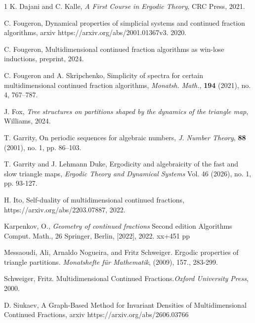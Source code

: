 \documentclass[12pt,oneside,openany]{article}
\begin{document}
\begin{thebibliography}{1}
 K. Dajani and C. Kalle, \textit{A First Course in Ergodic Theory}, CRC Press, 2021.


 C. Fougeron, Dynamical properties of simplicial systems and continued fraction algorithms,
arxiv  https://arxiv.org/abs/2001.01367v3. 2020.


 C. Fougeron,  Multidimensional continued fraction algorithms as win-lose inductions, preprint,
  2024.



 C. Fougeron and A. Skripchenko, Simplicity of spectra for certain multidimensional continued fraction algorithms, {\it Monatsh. Math.}, \textbf{194} (2021), no. 4, 767--787.

 J. Fox, {\it Tree structures on partitions shaped by the dynamics of the triangle map}, Williams, 2024. 



 T. Garrity,  On periodic sequences for algebraic numbers, \emph{J. Number Theory}, \textbf{88} (2001), no. 1, pp. 86--103.

 T. Garrity and J. Lehmann Duke,  Ergodicity and algebraicity of the fast and slow triangle maps, 
{\it Ergodic Theory and  Dynamical Systems} Vol.  46 (2026), no. 1, pp. 93-127.


  H. Ito, Self-duality of multidimensional continued fractions, https://arxiv.org/abs/2203.07887, 2022.


  Karpenkov, O., {\it Geometry of continued fractions}
Second edition 
Algorithms Comput. Math., 26
Springer, Berlin, [2022], 2022. xx+451 pp


Messaoudi, Ali, Arnaldo Nogueira, and Fritz Schweiger. Ergodic properties of triangle partitions. {\it Monatshefte f\"{u}r Mathematik}, (2009), 157., 283-299. 


Schweiger, Fritz. Multidimensional Continued Fractions.{\it Oxford University Press}, 2000. 


 D. Siukaev, A Graph-Based Method for Invariant Densities of Multidimensional Continued Fractions, arxiv https://arxiv.org/abs/2606.03766


\end{thebibliography}
\end{document}
